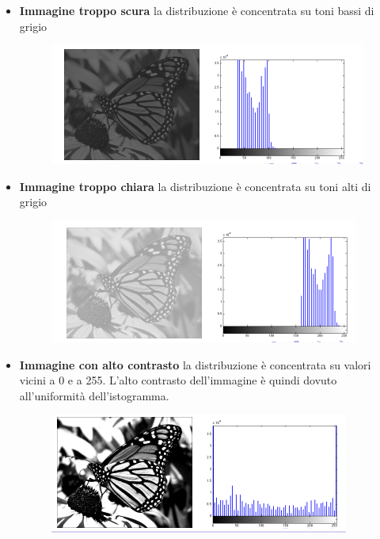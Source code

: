 \begin{itemize}
    \item \textbf{Immagine troppo scura}
          la distribuzione è concentrata su toni bassi di grigio

          \begin{figure}[H]
              \centering
              \includegraphics[width=\linewidth, keepaspectratio]{capitoli/immagini/imgs/isto-scuro.png}
          \end{figure}

    \item \textbf{Immagine troppo chiara}
          la distribuzione è concentrata su toni alti di grigio

          \begin{figure}[H]
              \centering
              \includegraphics[width=\linewidth, keepaspectratio]{capitoli/immagini/imgs/isto-chiaro.png}
          \end{figure}

    \item \textbf{Immagine con alto contrasto}
          la distribuzione è concentrata su valori vicini a 0 e a 255. L'alto contrasto dell'immagine è quindi dovuto all'uniformità dell'istogramma.

          \begin{figure}[H]
              \centering
              \includegraphics[width=\linewidth, keepaspectratio]{capitoli/immagini/imgs/alto-c.png}
          \end{figure}
\end{itemize}

